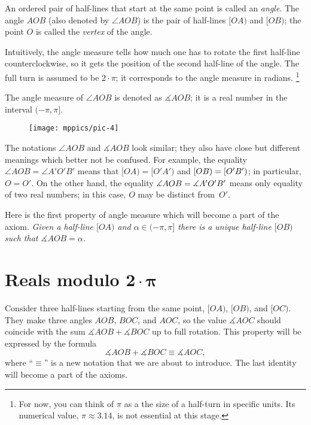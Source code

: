 An ordered pair of half-lines that start at the same point is called an \emph{angle}.
The angle $AOB$ (also denoted by $\angle AOB$) is the pair of half-lines $[OA)$ and $[OB)$; the point $O$ is called the \emph{vertex} of the angle.

Intuitively, the angle measure tells how much one has to rotate the first half-line counterclockwise, so it gets the position of the second half-line of the angle. 
The full turn is assumed to be $2\cdot\pi$;
it corresponds to the angle measure in radians.%
\footnote{For now, you can think of $\pi$ as a the size of a half-turn in specific units. Its numerical value, $\pi\approx 3.14$, is not essential at this stage.}

The angle measure of $\angle AOB$ is denoted as  $\measuredangle AOB$;
it is a real number in the interval $(-\pi,\pi]$. 

\begin{wrapfigure}{o}{25mm}
\vskip-0mm
\centering
\texttt{[image: mppics/pic-4]}
\end{wrapfigure}

The notations $\angle AOB$ and $\measuredangle AOB$ look similar;
they also have close but different meanings which better not be confused.
For example, the equality 
$\angle AOB=\angle A'O'B'$
means that
$[OA)=[O'A')$ and $[OB)=[O'B')$;
in particular, $O=O'$.
On the other hand, the equality 
$\measuredangle AOB=\measuredangle A'O'B'$ 
means only equality of two real numbers;
in this case, $O$ may be distinct from~$O'$.

Here is the first property of angle measure which will become a part of the axiom.
\textit{Given a half-line $[O A)$ and $\alpha\in(-\pi,\pi]$ there is a unique half-line $[O B)$ such that $\measuredangle A O B= \alpha$.}



\section[\texorpdfstring{Reals modulo $2\cdot\pi$}{Reals modulo 2·π}]{Reals modulo $\bm{2\cdot\pi}$}



Consider three half-lines starting from the same point, $[O A)$, $[O B)$, and $[O C)$.
They make three angles $A O B$, $B O C$, and $A O C$,
so the value $\measuredangle A O C$ should coincide with
the sum $\measuredangle A O B+\measuredangle B O C$ up to full rotation.
This property will be expressed by the formula 
$$\measuredangle A O B+\measuredangle B O C\equiv \measuredangle A O C,$$
where ``$\equiv$'' is a new notation that we are about to introduce.
The last identity will become a part of the axioms.

